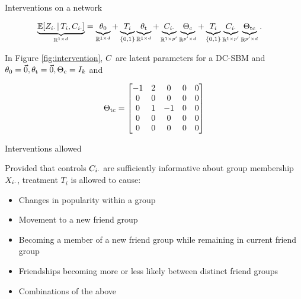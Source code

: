 \documentclass{beamer}
\theoremstyle{remark}
\begin{document}
\begin{frame}{Interventions on a network}

    \begin{align*}
        \underbrace{\E[T_i, \C_{i \cdot}]{\Z_{i \cdot}}}_{\R^{1 \times d}}
         & = \underbrace{\thetazero}_{\R^{1 \times d}}
        + \underbrace{T_i}_{\{0, 1\}} \underbrace{\thetat}_{\R^{1 \times d}}
        + \underbrace{\C_{i \cdot}}_{\R^{1 \times p'}} \underbrace{\Thetac}_{\R^{p' \times d}}
        + \underbrace{T_i}_{\{0, 1\}} \underbrace{\C_{i \cdot}}_{\R^{1 \times p'}} \underbrace{\Thetatc}_{\R^{p' \times d}}.
    \end{align*}

    In Figure \ref{fig:intervention}, $C$ are latent parameters for a DC-SBM and $\theta_0 = \vec 0, \theta_\text{t} = \vec 0, \Theta_\text{c} = I_k$ and

    \begin{align*}
        \Theta_\text{tc} =
        \begin{bmatrix}
            -1 & 2 & 0  & 0 & 0 \\
            0  & 0 & 0  & 0 & 0 \\
            0  & 1 & -1 & 0 & 0 \\
            0  & 0 & 0  & 0 & 0 \\
            0  & 0 & 0  & 0 & 0 \\
        \end{bmatrix}
    \end{align*}
\end{frame}

\begin{frame}{Interventions allowed}

    Provided that controls $C_{i \cdot}$ are sufficiently informative about group membership $X_{i \cdot}$, treatment $T_i$ is allowed to cause:

    \begin{itemize}
        \item Changes in popularity within a group
        \item Movement to a new friend group
        \item Becoming a member of a new friend group while remaining in current friend group
        \item Friendships becoming more or less likely between distinct friend groups
        \item Combinations of the above
    \end{itemize}

\end{frame}



\end{document}
